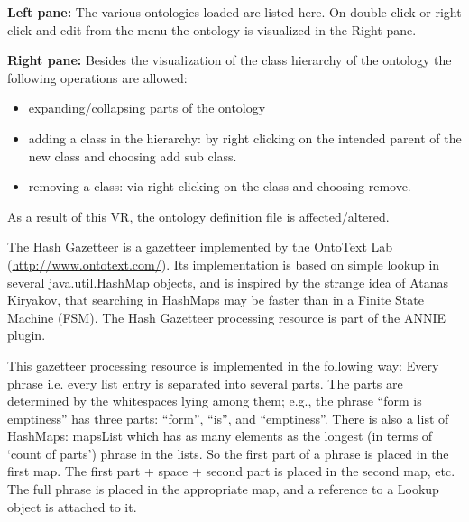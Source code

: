 \textbf{Left pane:}
The various ontologies loaded are listed here. On double click or
right click and edit from the menu the ontology is visualized in the
Right pane. 
	
\textbf{Right pane:} 
Besides the visualization of the class hierarchy of the
ontology the following operations are allowed: 
\begin{itemize}
\item expanding/collapsing parts of the ontology
\item adding a class in the hierarchy: by right clicking on the
intended parent of the new class and choosing add sub class. 
\item removing a class: via right clicking on the class and choosing
remove. 
\end{itemize}

As a result of this VR, the ontology definition file is
affected/altered. 

	

The Hash Gazetteer is a gazetteer implemented by the OntoText Lab
(\url{http://www.ontotext.com/}). Its implementation is based on simple lookup
in several java.util.HashMap objects, and is inspired by the strange idea of
Atanas Kiryakov, that searching in HashMaps may be faster than in a Finite State
Machine (FSM).  The Hash Gazetteer processing resource is part of the ANNIE
plugin.

This gazetteer processing resource is implemented in the following way: Every
phrase {i.e. every list entry} is separated into several parts. The parts are
determined by the whitespaces lying among them; e.g., the phrase ``form is
emptiness'' has three parts: ``form'', ``is'', and ``emptiness''.  There is also
a list of HashMaps: mapsList which has as many elements as the longest (in terms
of `count of parts') phrase in the lists. So the first part of a phrase is
placed in the first map. The first part + space + second part is placed in the
second map, etc. The full phrase is placed in the appropriate map, and a
reference to a Lookup object is attached to it.

